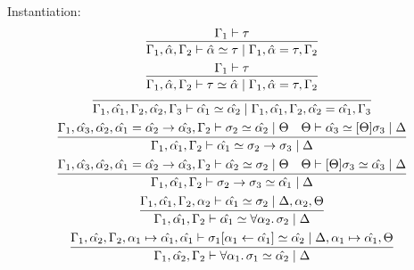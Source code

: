 Instantiation:
\begin{gather*}
  \infer{\Gamma_1, \hat{\alpha}, \Gamma_2 \vdash \hat{\alpha} \simeq \tau \mid \Gamma_1, \hat{\alpha} = \tau, \Gamma_2}{
    \Gamma_1 \vdash \tau
  }
  \\
  \infer{\Gamma_1, \hat{\alpha}, \Gamma_2 \vdash \tau \simeq \hat{\alpha} \mid \Gamma_1, \hat{\alpha} = \tau, \Gamma_2}{
    \Gamma_1 \vdash \tau
  }
  \\
  \infer{\Gamma_1, \hat{\alpha_1}, \Gamma_2, \hat{\alpha_2}, \Gamma_3 \vdash \hat{\alpha_1} \simeq \hat{\alpha_2} \mid \Gamma_1, \hat{\alpha_1}, \Gamma_2, \hat{\alpha_2} = \hat{\alpha_1}, \Gamma_3}{}
  \\
  \infer{\Gamma_1, \hat{\alpha_1}, \Gamma_2 \vdash \hat{\alpha_1} \simeq \sigma_2 \to \sigma_3 \mid \Delta}{
    \Gamma_1, \hat{\alpha_3}, \hat{\alpha_2}, \hat{\alpha_1} = \hat{\alpha_2} \to \hat{\alpha_3}, \Gamma_2 \vdash \sigma_2 \simeq \hat{\alpha_2} \mid \Theta
    &
    \Theta \vdash \hat{\alpha_3} \simeq [\Theta]\sigma_3 \mid \Delta
  }
  \\
  \infer{\Gamma_1, \hat{\alpha_1}, \Gamma_2 \vdash \sigma_2 \to \sigma_3 \simeq \hat{\alpha_1} \mid \Delta}{
    \Gamma_1, \hat{\alpha_3}, \hat{\alpha_2}, \hat{\alpha_1} = \hat{\alpha_2} \to \hat{\alpha_3}, \Gamma_2 \vdash \hat{\alpha_2} \simeq \sigma_2 \mid \Theta
    &
    \Theta \vdash [\Theta]\sigma_3 \simeq \hat{\alpha_3} \mid \Delta
  }
  \\
  \infer{\Gamma_1, \hat{\alpha_1}, \Gamma_2 \vdash \hat{\alpha_1} \simeq \forall \alpha_2\ldotp \sigma_2 \mid \Delta}{
    \Gamma_1, \hat{\alpha_1}, \Gamma_2, \alpha_2 \vdash \hat{\alpha_1} \simeq \sigma_2 \mid \Delta, \alpha_2, \Theta
  }
  \\
  \infer{\Gamma_1, \hat{\alpha_2}, \Gamma_2 \vdash \forall \alpha_1\ldotp \sigma_1 \simeq \hat{\alpha_2} \mid \Delta}{
    \Gamma_1, \hat{\alpha_2}, \Gamma_2, \alpha_1 \mapsto \hat{\alpha_1}, \hat{\alpha_1} \vdash \sigma_1[\alpha_1 \assign \hat{\alpha_1}] \simeq \hat{\alpha_2} \mid \Delta, \alpha_1 \mapsto \hat{\alpha_1}, \Theta
  }
\end{gather*}
